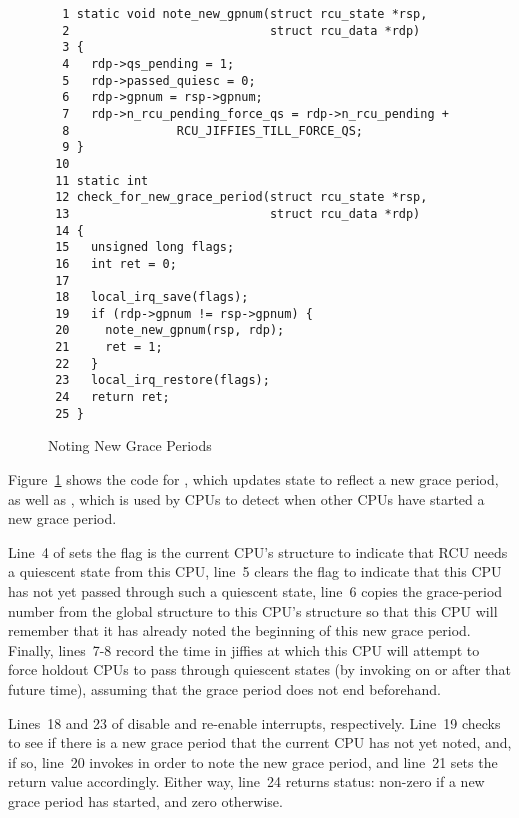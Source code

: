 \begin{figure}[tbp]
{ \scriptsize
\begin{verbatim}
  1 static void note_new_gpnum(struct rcu_state *rsp,
  2                            struct rcu_data *rdp)
  3 {
  4   rdp->qs_pending = 1;
  5   rdp->passed_quiesc = 0;
  6   rdp->gpnum = rsp->gpnum;
  7   rdp->n_rcu_pending_force_qs = rdp->n_rcu_pending +
  8               RCU_JIFFIES_TILL_FORCE_QS;
  9 }
 10
 11 static int
 12 check_for_new_grace_period(struct rcu_state *rsp,
 13                            struct rcu_data *rdp)
 14 {
 15   unsigned long flags;
 16   int ret = 0;
 17
 18   local_irq_save(flags);
 19   if (rdp->gpnum != rsp->gpnum) {
 20     note_new_gpnum(rsp, rdp);
 21     ret = 1;
 22   }
 23   local_irq_restore(flags);
 24   return ret;
 25 }
\end{verbatim}
}
\caption{Noting New Grace Periods}
\label{fig:app:rcuimpl:rcutreewt:Noting New Grace Periods}
\end{figure}

Figure~\ref{fig:app:rcuimpl:rcutreewt:Noting New Grace Periods}
shows the code for , which updates state to reflect
a new grace period, as well as , which
is used by CPUs to detect when other CPUs have started a new grace period.

Line~4 of  sets the  flag is
the current CPU's  structure to indicate that RCU needs
a quiescent state from this CPU, line~5 clears the 
flag to indicate that this CPU has not yet passed through such a
quiescent state,
line~6 copies the grace-period number from the global 
structure to this CPU's  structure so that this CPU will
remember that it has already noted the beginning of this new grace
period.
Finally, lines~7-8 record the time in jiffies at which this CPU
will attempt to force holdout CPUs to pass through quiescent states
(by invoking  on or after that future time),
assuming that the grace period does not end beforehand.

Lines~18 and 23 of  disable and
re-enable interrupts, respectively.
Line~19 checks to see if there is a new grace period that the current
CPU has not yet noted, and, if so, line~20 invokes 
in order to note the new grace period, and line~21 sets the return value
accordingly.
Either way, line~24 returns status: non-zero if a new grace period has
started, and zero otherwise.

